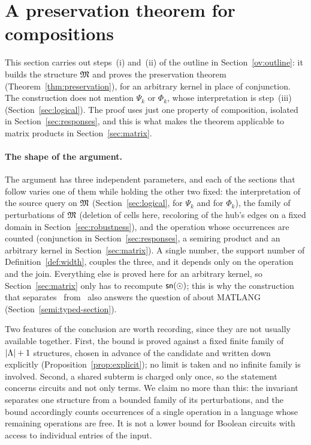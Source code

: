 \section{A preservation theorem for compositions}\label{sec:preservation}
This section carries out steps~(i) and~(ii) of the outline in
Section~\ref{ov:outline}: it builds the structure $\mathfrak M$ and proves the
preservation theorem (Theorem~\ref{thm:preservation}), for an arbitrary
kernel in place of conjunction. The construction does not mention $\Psi_k$
or $\Phi_k$, whose interpretation is step~(iii) (Section~\ref{sec:logical}).
The proof uses just one property of composition, isolated in
Section~\ref{sec:responses}, and this is what makes the theorem applicable
to matrix products in Section~\ref{sec:matrix}.

\paragraph{The shape of the argument.}
The argument has three independent parameters, and each of the sections
that follow varies one of them while holding the other two fixed: the
interpretation of the source query on $\mathfrak M$ (Section~\ref{sec:logical}, for
$\Psi_k$ and for $\Phi_k$), the family of perturbations of $\mathfrak M$ (deletion
of cells here, recoloring of the hub's edges on a fixed domain in
Section~\ref{sec:robustness}), and the operation whose occurrences are
counted (conjunction in Section~\ref{sec:responses}, a semiring product and
an arbitrary kernel in Section~\ref{sec:matrix}). A single number, the
support number of Definition~\ref{def:width}, couples the three, and it
depends only on the operation and the join. Everything else is proved here
for an arbitrary kernel, so Section~\ref{sec:matrix} only has to recompute
$\mathsf{sn}(\odot)$; this is why the construction that separates \FOthree\ from
\CoR\ also answers the question of \citet{brijder2019} about MATLANG
(Section~\ref{semi:typed-section}).

Two features of the conclusion are worth recording, since they are not
usually available together. First, the bound is proved against a fixed
finite family of $|\Lambda|+1$ structures, chosen in advance of the candidate
and written down explicitly (Proposition~\ref{prop:explicit}); no limit is
taken and no infinite family is involved. Second, a shared subterm is
charged only once, so the statement concerns circuits and not only terms.
We claim no more than this: the invariant separates one structure from a
bounded family of its perturbations, and the bound accordingly counts
occurrences of a single operation in a language whose remaining operations
are free. It is not a lower bound for Boolean circuits with access to
individual entries of the input.

